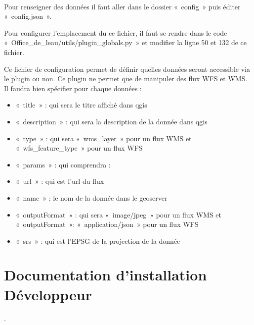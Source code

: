 \documentclass[letterpaper,10pt,french]{sphinxmanual}
\let\sphinxpxdimen\pdfpxdimen\else\newdimen\sphinxpxdimen
\begin{document}
\noindent{\hspace*{\fill}\sphinxincludegraphics[width=600\sphinxpxdimen]{{plugin_base}.png}\hspace*{\fill}}

\sphinxAtStartPar
 

\sphinxAtStartPar
Pour renseigner des données il faut aller dans le dossier « config » puis éditer « config.json ».

\sphinxAtStartPar
Pour configurer l’emplacement du ce fichier, il faut se rendre dans le code « Office\_de\_leau/utils/plugin\_globals.py » et modifier la ligne 50 et 132 de ce fichier.

\sphinxAtStartPar
Ce fichier de configuration permet de définir quelles données seront accessible via le plugin ou non.
Ce plugin ne permet que de manipuler des flux WFS et WMS. Il faudra bien spécifier pour chaque données :
\begin{itemize}
\item {} 
\sphinxAtStartPar
« title » : qui sera le titre affiché dans qgis

\item {} 
\sphinxAtStartPar
« description » : qui sera la description de la donnée dans qgis

\item {} 
\sphinxAtStartPar
« type » : qui sera « wms\_layer » pour un flux WMS et « wfs\_feature\_type » pour un flux WFS

\item {} 
\sphinxAtStartPar
« params » : qui comprendra :

\item {} 
\sphinxAtStartPar
« url » : qui est l’url du flux

\item {} 
\sphinxAtStartPar
« name » : le nom de la donnée dans le geoserver

\item {} 
\sphinxAtStartPar
« outputFormat » : qui sera « image/jpeg » pour un flux WMS et  « outputFormat »: « application/json » pour un flux WFS

\item {} 
\sphinxAtStartPar
« srs » : qui est l’EPSG de la projection de la donnée

\end{itemize}

\sphinxstepscope


\chapter{Documentation d’installation \sphinxhyphen{} Développeur}
\label{\detokenize{doc_instal:documentation-d-installation-developpeur}}\label{\detokenize{doc_instal::doc}}
\sphinxAtStartPar
{}.
\end{document}
